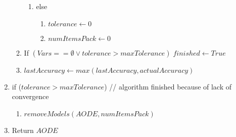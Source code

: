 \begin{enumerate}
\begin{enumerate}
\begin{enumerate}
        \item else
        \begin{enumerate}
            \item $tolerance \leftarrow 0$
            \item $numItemsPack \leftarrow 0$
         \end{enumerate}
    \end{enumerate}
    \item If $(Vars == \emptyset \lor tolerance>maxTolerance) \; finished \leftarrow True$
    \item $lastAccuracy \leftarrow max(lastAccuracy, actualAccuracy)$
\end{enumerate}
\item if ($tolerance > maxTolerance$) \hspace*{1cm} // algorithm finished because of lack of convergence
\begin{enumerate}
    \item $removeModels(AODE, numItemsPack)$
\end{enumerate}
\item Return $AODE$
\end{enumerate}